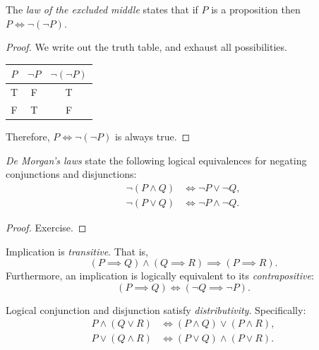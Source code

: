 \documentclass[../ium.tex]{subfiles}
\begin{document}
\begin{theorem}
\begin{shaded*}
The \textit{law of the excluded middle} states that if $P$ is a proposition then $P\iff \neg(\neg P)$. 
\end{shaded*}
\end{theorem}
\begin{proof}
We write out the truth table, and exhaust all possibilities.
\begin{center}
    \begin{tabular}{c|c|c}
    $P$ & $\neg P$ & $\neg(\neg P)$ \\
    \hline
    T & F & T \\
    F & T & F \\
    \end{tabular}
\end{center}
Therefore, $P\iff \neg(\neg P)$ is always true.\qedhere
\end{proof}

\begin{theorem}
\begin{shaded*}
\textit{De Morgan's laws} state the following logical equivalences for negating conjunctions and disjunctions:
\begin{align*}
    \neg (P \land Q) &\iff \neg P \lor \neg Q, \\
    \neg (P \lor Q) &\iff \neg P \land \neg Q.
\end{align*}
\end{shaded*}
\end{theorem}
\begin{proof}
Exercise.\qedhere
\end{proof}

\begin{theorem}
\begin{shaded*}
Implication is \textit{transitive}. That is,
\[
(P \implies Q) \land (Q \implies R) \implies (P \implies R).
\]
Furthermore, an implication is logically equivalent to its \textit{contrapositive}:
\[
(P \implies Q) \iff (\neg Q \implies \neg P).
\]
\end{shaded*}
\end{theorem}

\begin{theorem}
\begin{shaded*}
Logical conjunction and disjunction satisfy \textit{distributivity}. Specifically:
\begin{align*}
    P \land (Q \lor R) &\iff (P \land Q) \lor (P \land R), \\
    P \lor (Q \land R) &\iff (P \lor Q) \land (P \lor R).
\end{align*}
\end{shaded*}
\end{theorem}
\end{document}
